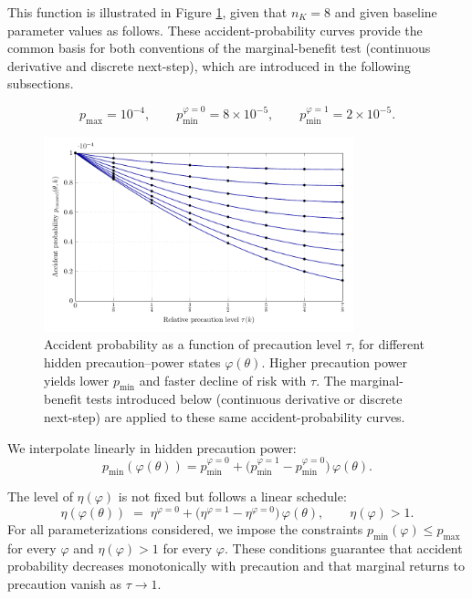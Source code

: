 \documentclass{article}
\begin{document}
This function is illustrated in Figure \ref{fig:precaution}, given that $n_K = 8$ and given baseline parameter values as follows. These accident-probability curves provide the common basis for both conventions of the marginal-benefit test (continuous derivative and discrete next-step), which are introduced in the following subsections.

\[
p_{\max}=10^{-4}, \qquad 
p_{\min}^{\varphi=0}=8\times 10^{-5}, \qquad 
p_{\min}^{\varphi=1}=2\times 10^{-5}.
\]

\begin{figure}[t]
  \centering
  \includegraphics[width=0.8\textwidth]{../Figures/precaution.pdf}
\caption{Accident probability as a function of precaution level $\tau$, for different hidden precaution–power states $\varphi(\theta)$. Higher precaution power yields lower $p_{\min}$ and faster decline of risk with $\tau$. The marginal-benefit tests introduced below (continuous derivative or discrete next-step) are applied to these same accident-probability curves.}
  \label{fig:precaution}
\end{figure}

We interpolate linearly in hidden precaution power:
\[
p_{\min}(\varphi(\theta)) = p_{\min}^{\varphi=0} +
\bigl(p_{\min}^{\varphi=1}-p_{\min}^{\varphi=0}\bigr)\,\varphi(\theta).
\]

The level of $\eta(\varphi)$ is not fixed but follows a linear schedule:
\[
\eta(\varphi(\theta)) \;=\; \eta^{\varphi=0} + 
\bigl(\eta^{\varphi=1}-\eta^{\varphi=0}\bigr)\,\varphi(\theta),
\qquad \eta(\varphi) > 1.
\]
For all parameterizations considered, we impose the constraints $p_{\min}(\varphi) \leq p_{\max}$ for every $\varphi$ and $\eta(\varphi) > 1$ for every $\varphi$. These conditions guarantee that accident probability decreases monotonically with precaution and that marginal returns to precaution vanish as $\tau \to 1$.
\end{document}
